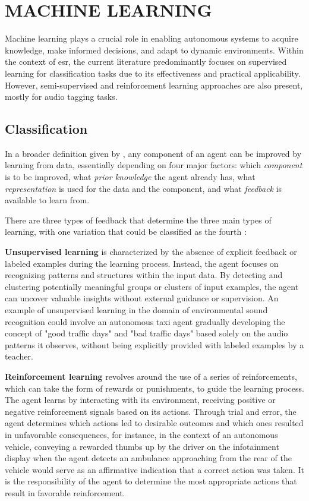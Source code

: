 \section{MACHINE LEARNING}
\label{sec:frmwk_machine_learning}

Machine learning plays a crucial role in enabling autonomous systems to acquire knowledge, make informed decisions, and adapt to dynamic environments. Within the context of \gls{esr}, the current literature predominantly focuses on supervised learning for classification tasks due to its effectiveness and practical applicability. However, semi-supervised and reinforcement learning approaches are also present, mostly for audio tagging tasks. 


\subsection{Classification}
\label{subsec:machine_learning_classification}

In a broader definition given by \textcite{Russel2010}, any component of an agent can be improved by learning from data, essentially depending on four major factors: which \textit{component} is to be improved, what \textit{prior knowledge} the agent already has, what \textit{representation} is used for the data and the component, and what \textit{feedback} is available to learn from.

There are three types of feedback that determine the three main types of learning, with one variation that could be classified as the fourth \cite{Russel2010}:

\textbf{Unsupervised learning} is characterized by the absence of explicit feedback or labeled examples during the learning process. Instead, the agent focuses on recognizing patterns and structures within the input data. By detecting and clustering potentially meaningful groups or clusters of input examples, the agent can uncover valuable insights without external guidance or supervision. An example of unsupervised learning in the domain of environmental sound recognition could involve an autonomous taxi agent gradually developing the concept of "good traffic days" and "bad traffic days" based solely on the audio patterns it observes, without being explicitly provided with labeled examples by a teacher.

\textbf{Reinforcement learning} revolves around the use of a series of reinforcements, which can take the form of rewards or punishments, to guide the learning process. The agent learns by interacting with its environment, receiving positive or negative reinforcement signals based on its actions. Through trial and error, the agent determines which actions led to desirable outcomes and which ones resulted in unfavorable consequences, for instance, in the context of an autonomous vehicle, conveying a rewarded thumbs up by the driver on the infotainment display when the agent detects an ambulance approaching from the rear of the vehicle would serve as an affirmative indication that a correct action was taken. It is the responsibility of the agent to determine the most appropriate actions that result in favorable reinforcement.

